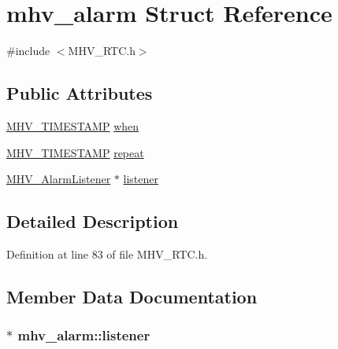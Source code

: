 \hypertarget{structmhv__alarm}{
\section{mhv\-\_\-alarm \-Struct \-Reference}
\label{structmhv__alarm}
}


{\ttfamily \#include $<$\-M\-H\-V\-\_\-\-R\-T\-C.\-h$>$}

\subsection*{\-Public \-Attributes}
\begin{DoxyCompactItemize}
\item 
\hyperlink{_m_h_v___r_t_c_8h_a1e30d3a92b1b868286bd0d619245d8a6}{\-M\-H\-V\-\_\-\-T\-I\-M\-E\-S\-T\-A\-M\-P} \hyperlink{structmhv__alarm_acbab8b3b4efa4d891d598cbd5b47fb7c}{when}
\item 
\hyperlink{_m_h_v___r_t_c_8h_a1e30d3a92b1b868286bd0d619245d8a6}{\-M\-H\-V\-\_\-\-T\-I\-M\-E\-S\-T\-A\-M\-P} \hyperlink{structmhv__alarm_ad8195c11cd5d6ff3bb37d01185c04af2}{repeat}
\item 
\hyperlink{class_m_h_v___alarm_listener}{\-M\-H\-V\-\_\-\-Alarm\-Listener} $\ast$ \hyperlink{structmhv__alarm_a6186f7bbb237eebe47cc16a5a94272fb}{listener}
\end{DoxyCompactItemize}


\subsection{\-Detailed \-Description}


\-Definition at line 83 of file \-M\-H\-V\-\_\-\-R\-T\-C.\-h.



\subsection{\-Member \-Data \-Documentation}
\hypertarget{structmhv__alarm_a6186f7bbb237eebe47cc16a5a94272fb}{
\subsubsection[{listener}]{$\ast$ {\bf mhv\-\_\-alarm\-::listener}}}
\label{structmhv__alarm_a6186f7bbb237eebe47cc16a5a94272fb}


